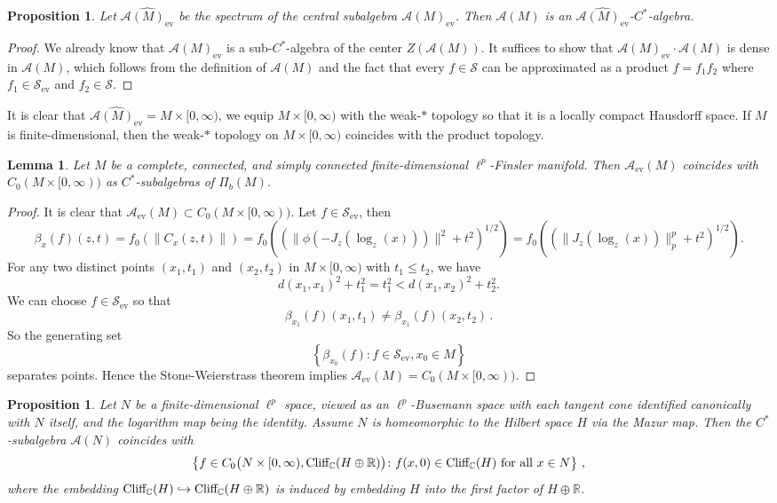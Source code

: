 \documentclass{article}
\theoremstyle{plain}
\newtheorem{lemma}[theorem]{Lemma}
\newtheorem{proposition}[theorem]{Proposition}
\theoremstyle{definition}
\theoremstyle{remark}
\def\A{\mathcal A}
\def\IR{\mathbb R}
\def\IC{\mathbb C}
\def\Cl{\textup{Cliff}_{\IC}}
\def\S{\mathcal S}
\begin{document}
	\begin{proposition}
		Let $\widehat{\mathcal{A}(M)_{\text{ev}}}$ be the spectrum of the central subalgebra $\mathcal{A}(M)_{\text{ev}}$. Then $\mathcal{A}(M)$ is an $\widehat{\mathcal{A}(M)_{\text{ev}}}$-{$C^*$-algebra}. 
	\end{proposition}
	\begin{proof}
		We already know that $\mathcal{A}(M)_{\text{ev}}$ is a sub-$C^*$-algebra of the center $Z(\mathcal{A}(M))$. It suffices to show that $\mathcal{A}(M)_{\text{ev}} \cdot \mathcal{A}(M)$ is dense in $\mathcal{A}(M)$, which follows from the definition of $\mathcal{A}(M)$ and the fact that every $f\in\S$ can be approximated as a product $f = f_1 f_2$ where $f_1 \in \S_\text{ev}$ and $f_2 \in \S$.
	\end{proof}
	It is clear that $\widehat{\mathcal{A}(M)_{\text{ev}}}=M\times [0,\infty)$, we equip $M\times [0,\infty)$ with the weak-$*$ topology so that it is a locally compact Hausdorff space. If $M$ is finite-dimensional, then the weak-$*$ topology on $M\times [0,\infty)$ coincides with the product topology.
	
	\begin{lemma}\label{Aev=c0}
		Let $M$ be a complete, connected, and simply connected finite-dimensional $\ell^p$-Finsler manifold. Then $\A_{\text{ev}} (M)$ coincides with $C_0(M \times [0,\infty))$ as $C^*$-subalgebras of $\Pi_{b} (M)$.
	\end{lemma}
	
	\begin{proof}
		It is clear that $\A_{\text{ev}} (M) \subset C_0(M \times [0,\infty))$. Let $f\in\S_{\text{ev}}$, then
		$$\beta_x(f)(z,t)=f_0(\|C_x(z,t)\|)=f_0((\|\phi(-J_z(\log_z(x)))\|^2+t^2)^{1/2})=f_0((\|J_z(\log_z(x))\|_p^p+t^2)^{1/2}).$$ 
		For any two distinct points $(x_1, t_1)$ and $(x_2 , t_2)$ in $M \times [0,\infty)$ with $t_1 \leq t_2$, we have
		\[
		d(x_1,x_1)^2 + t_1^2 = t_1^2 < d(x_1,x_2)^2 + t_2^2.
		\]
		We can choose $f \in \S_\text{ev}$ so that 
		\[
		\beta_{x_1} (f) (x_1, t_1) \not= \beta_{x_1} (f) (x_2, t_2) \, .
		\]
		So the generating set 
		\[
		\left\{ \beta_{x_0} (f) \colon f \in \S_\text{ev}, x_0 \in M \right\}
		\]
		separates points. Hence the Stone-Weierstrass theorem implies $\A_{\text{ev}}(M) = C_0(M \times [0,\infty))$. 
	\end{proof}
	
	\begin{proposition}
		Let $N$ be a finite-dimensional $\ell^p$ space, viewed as an $\ell^p$-Busemann space with each tangent cone identified canonically with $N$ itself, and the logarithm map being the identity. Assume $N$ is homeomorphic to the Hilbert space $H$ via the Mazur map. Then the $C^*$-subalgebra $\A(N)$ coincides with 
		\begin{equation}
			\left\{ f \in C_0 \big( N \times [0, \infty) , \Cl (H \oplus \IR ) \big) \colon f( x , 0 ) \in \Cl (H) \text{ for all } x \in N \right\} \, ,
		\end{equation}
		where the embedding $\Cl(H) \hookrightarrow \Cl (H\oplus \IR )$ is induced by embedding $H$ into the first factor of $H \oplus \IR$.  
	\end{proposition}
	
\end{document}

